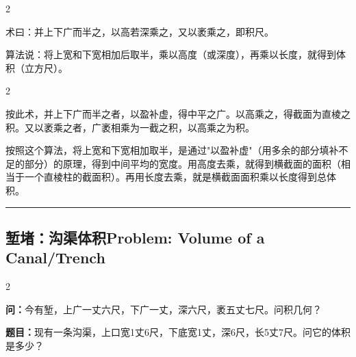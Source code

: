 \documentclass[11pt,a4paper]{article}
\newcommand{\longline}{\noindent\rule{\textwidth}{0.4pt}}
\newcommand{\bilingualsubsection}[2]{%
  \subsection{#1\hfill\normalfont\normalsize\color{sectioncolor}#2}%
}
\begin{document}
\vspace{0.2cm}

\begin{paracol}{2}

\begin{methodbox}[\CJKfamily{rm}术 · 原文]
术曰：并上下广而半之，以高若深乘之，又以袤乘之，即积尺。
\end{methodbox}

\switchcolumn

\begin{methodbox}
算法说：将上宽和下宽相加后取半，乘以高度（或深度），再乘以长度，就得到体积（立方尺）。
\end{methodbox}

\end{paracol}

\vspace{0.2cm}

\begin{paracol}{2}

\begin{commentarybox}
按此术，并上下广而半之者，以盈补虚，得中平之广。以高乘之，得截面为直棱之积。又以袤乘之者，广袤相乘为一截之积，以高乘之为积。
\end{commentarybox}

\switchcolumn

\begin{commentarybox}
按照这个算法，将上宽和下宽相加取半，是通过"以盈补虚"（用多余的部分填补不足的部分）的原理，得到中间平均的宽度。用高度去乘，就得到横截面的面积（相当于一个直棱柱的截面积）。再用长度去乘，就是横截面面积乘以长度得到总体积。
\end{commentarybox}

\end{paracol}

\vspace{0.5cm}
\longline
\vspace{0.3cm}

\bilingualsubsection{堑堵：沟渠体积}{Problem: Volume of a Canal/Trench}

\begin{paracol}{2}

\begin{problembox}[\CJKfamily{rm}堑堵 · 原文]
\textbf{问：}今有堑，上广一丈六尺，下广一丈，深六尺，袤五丈七尺。问积几何？
\end{problembox}

\switchcolumn

\begin{problembox}
\textbf{题目：}现有一条沟渠，上口宽1丈6尺，下底宽1丈，深6尺，长5丈7尺。问它的体积是多少？
\end{problembox}

\end{paracol}
\end{document}
